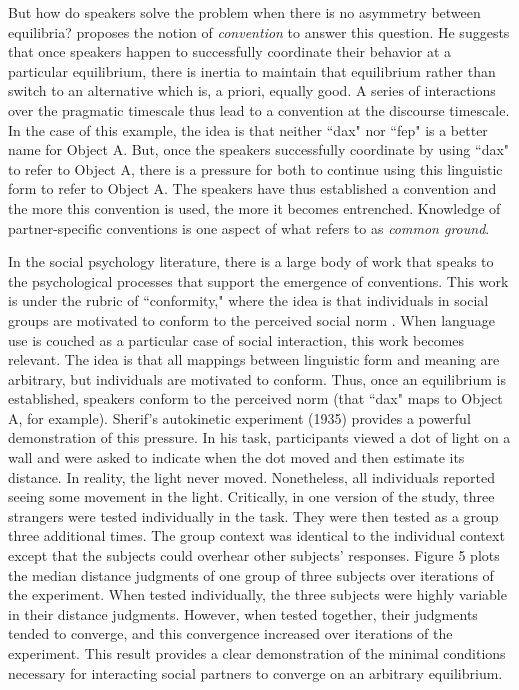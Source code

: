 \documentclass[man, noapacite, 12pt]{apa2}
\begin{document}
But how do speakers solve the problem when there is no asymmetry between equilibria?  proposes the notion of {\it convention} to answer this question. He suggests that once speakers happen to successfully coordinate their behavior at a particular equilibrium, there is inertia to maintain that equilibrium rather than switch to an alternative which is, a priori, equally good. A series of  interactions over the pragmatic timescale thus lead to a convention at the discourse timescale. In the case of this example, the idea is that neither ``dax" nor ``fep" is a better name for Object A. But, once the speakers successfully coordinate by using ``dax" to refer to Object A, there is a pressure for both to continue using this linguistic form to refer to Object A. The speakers have thus established a convention and the more this convention is used, the more  it becomes entrenched. Knowledge of partner-specific conventions is one aspect of what  refers to as {\it common ground}.

In the social psychology literature, there is a large body of work that speaks to the psychological processes that support the emergence of conventions. This work is under the rubric of ``conformity," where the idea is that individuals in social groups are motivated to conform to the perceived social norm  \cite{cialdini2004social}. When language use is couched as a particular case of social interaction, this work becomes relevant. The idea is that all mappings between linguistic form and meaning are arbitrary, but individuals are motivated to conform. Thus, once an equilibrium is established, speakers conform to the perceived norm (that ``dax" maps to Object A, for example).  Sherif's autokinetic experiment (1935)\nocite{sherif1935} provides a powerful demonstration of this pressure. In his task, participants viewed a dot of light on a wall and were asked to indicate when the dot moved and then estimate its distance. In reality, the light never moved. Nonetheless, all individuals reported seeing some movement in the light. Critically, in one version of the study, three strangers  were tested individually in the task. They were then tested as a group three additional times. The group context was identical to the individual context except that the subjects could overhear other subjects' responses. Figure 5 plots the median distance judgments of one group of three subjects over iterations of the experiment. When tested individually, the three subjects were highly variable in their distance judgments. However, when tested together, their judgments tended to converge, and this convergence increased over iterations of the experiment. This result provides a clear demonstration of the minimal conditions necessary for interacting social partners to converge on an arbitrary equilibrium. 
\end{document}
